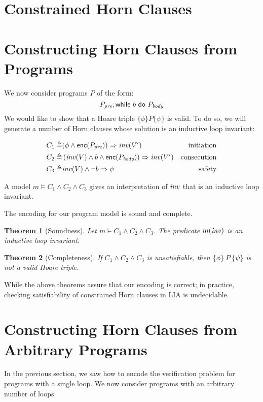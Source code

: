 \documentclass{amsart}
\newtheorem{theorem}{Theorem}[section]
\theoremstyle{definition}
\theoremstyle{remark}
\numberwithin{equation}{section}
\begin{document}
\section{Constrained Horn Clauses}

\section{Constructing Horn Clauses from Programs}
We now consider programs $P$
of the form:
$$P_{\emph{pre}}; \mathsf{while}~ b ~\mathsf{do}~ P_{\emph{body}}$$
We would like to show that a Hoare triple
$\{\phi\} P \{\psi\}$ is valid.
To do so, we will generate a number of Horn clauses
whose solution is an inductive loop invariant:

\begin{align*}
  C_1 \triangleq&
  (\phi \land \enc(P_\pre)) \Rightarrow \inv(V') & \text{initiation}\\
  C_2 \triangleq&
  \left(\inv(V) \land b \land
    \enc(P_\body)\right) \Rightarrow \inv(V') & \text{consecution}\\
%
  C_3 \triangleq&
    \inv(V) \land \neg b \Rightarrow \psi & \text{safety}
\end{align*}

A model $m \models C_1\land C_2 \land C_3$
gives an interpretation of $\mathit{inv}$ that is an inductive loop invariant.

The encoding for our program model is sound and complete.

\begin{theorem}[Soundness]
Let $m \models C_1 \land C_2 \land C_3$.
The predicate $m(\mathit{inv})$ is an inductive loop invariant.
\end{theorem}

\begin{theorem}[Completeness]
If $C_1 \land C_2 \land C_3$ is unsatisfiable,
then $\{\phi\} ~ P ~ \{\psi\}$ is not a valid Hoare triple.
\end{theorem}

While the above theorems assure that our encoding
is correct; in practice, checking satisfiability of
constrained Horn clauses in LIA is undecidable.

\section{Constructing Horn Clauses from Arbitrary Programs}
In the previous section, we saw how to encode the verification
problem for programs with a single loop. We now consider programs
with an arbitrary number of loops.
\end{document}
